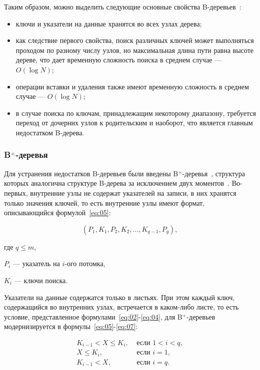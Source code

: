 Таким образом, можно выделить следующие основные свойства
\mbox{B-деревьев}~\cite{marvel}:
\begin{itemize}
    \item ключи и указатели на данные хранятся во всех узлах дерева;
    \item как следствие первого свойства, поиск различных ключей может
        выполняться проходом по разному числу узлов, но максимальная длина пути
        равна высоте дереве, что дает временную сложность поиска в среднем
        случае --- $O(\log N)$;
    \item операции вставки и удаления также имеют временную сложность в среднем
        случае --- $O(\log N)$;
    \item в случае поиска по ключам, принадлежащим некоторому диапазону,
        требуется переход от дочерних узлов к родительским и наоборот, что
        является главным недостатком B-дерева.
\end{itemize}

\subsubsection{B$^+$-деревья}

Для устранения недостатков B-деревьев были введены B$^+$-деревья~\cite{marvel},
структура которых аналогична структуре B-дерева за исключением двух
моментов~\cite{arki}.  Во-первых, внутренние узлы не содержат указателей на
записи, в них хранятся только значения ключей, то есть внутренние узлы имеют
формат, описывающийся формулой~\eqref{eq:05}:

\begin{equation}\label{eq:05}
    (P_1, K_1, P_2, K_2, \dots, K_{q-1}, P_q),
\end{equation}

где $q \leqslant m$,

$P_i$ --- указатель на $i$-ого потомка,

$K_i$ --- ключи поиска.

Указатели на данные содержатся только в листьях. При этом каждый ключ,
содержащийся во внутренних узлах, встречается в каком-либо листе, то есть
условие, представленное формулами~\eqref{eq:02}-\eqref{eq:04}, для
B$^+$-деревьев модернизируется в формулы~\eqref{eq:05}-\eqref{eq:07}:

\vspace{-1cm}
\begin{align}
    K_{i-1} < X \leqslant K_i, & \text{ если } 1 < i < q, \label{eq:05}\\
    X \leqslant K_i, & \text{ если } i = 1, \label{eq:06}\\
    K_{i-1} < X, & \text{ если } i = q. \label{eq:07}
\end{align}
\vspace{-1cm}

